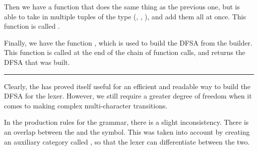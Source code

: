 \begin{figure}[H]
    \begin{subfigure}[t]{0.5\textwidth}
        \centering
    \end{subfigure}
    \begin{subfigure}[t]{0.5\textwidth}
        \centering
    \end{subfigure}
\end{figure}

Then we have a function that does the same thing as the previous one, but is
able to take in multiple tuples of the type (, ,
), and add them all at once. This function is called
.

Finally, we have the function , which is used to build the DFSA from the builder. This function is called at the end of the chain of function calls, and returns the DFSA that was built.

\begin{center}
    \rule{0.5\textwidth}{0.4pt}
\end{center}

Clearly, the  has proved itself useful for an efficient and
readable way to build the DFSA for the lexer. However, we still require a
greater degree of freedom when it comes to making complex multi-character
transitions.

\begin{warningbox}{}
    In the production rules for the  grammar, there is a slight
    inconsistency. There is an overlap between the  and the
     symbol. This was taken into account by creating an auxiliary
    category called , so that the lexer can differentiate
    between the two.
\end{warningbox}

